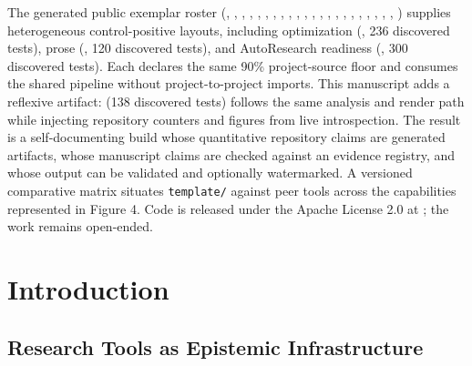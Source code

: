 \documentclass[
  english,
]{article}
\begin{document}
The generated public exemplar roster
(,
,
,
,
,
,
,
,
,
,
,
,
,
,
,
,
,
,
,
,
,
,
) supplies heterogeneous
control-positive layouts, including optimization
(, 236 discovered tests), prose
(, 120 discovered tests), and
AutoResearch readiness (, 300
discovered tests). Each declares the same 90\% project-source floor and
consumes the shared pipeline without project-to-project imports. This
manuscript adds a reflexive artifact:  (138
discovered tests) follows the same analysis and render path while
injecting repository counters and figures from live introspection. The
result is a self-documenting build whose quantitative repository claims
are generated artifacts, whose manuscript claims are checked against an
evidence registry, and whose output can be validated and optionally
watermarked. A versioned comparative matrix situates \texttt{template/}
against peer tools across the capabilities represented in Figure 4. Code
is released under the Apache License 2.0 at
; the work remains open-ended.

\newpage

\section{Introduction}\label{introduction}

\subsection{Research Tools as Epistemic
Infrastructure}\label{research-tools-as-epistemic-infrastructure}
\end{document}
